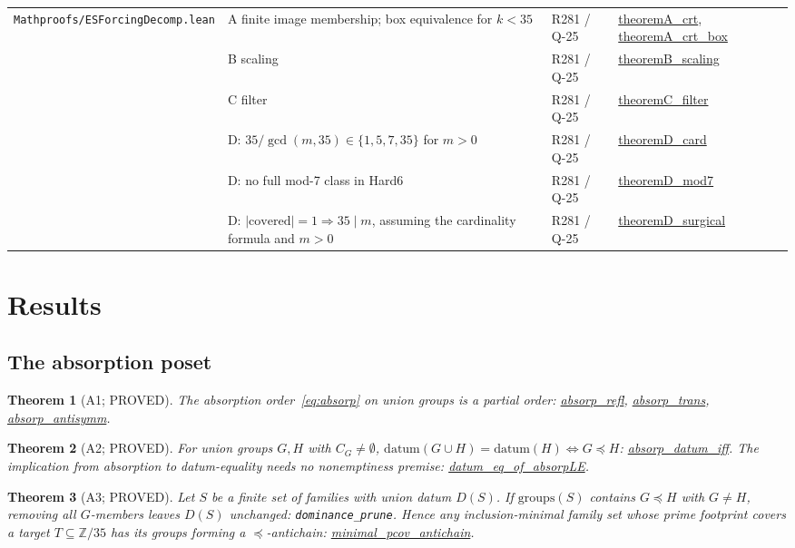 \documentclass[11pt,a4paper]{article}
\newtheorem{theorem}{Theorem}
\theoremstyle{definition}
\begin{document}
\begin{table}[t]
\begin{tabular}{p{3.6cm}p{4.6cm}p{2.6cm}p{3.6cm}}
    \texttt{\small Mathproofs/ESForcingDecomp.lean} &
      A finite image membership; box equivalence for $k<35$ & R281 / Q-25 &
      {\small\url{theoremA_crt}, \url{theoremA_crt_box}} \\
    & B scaling & R281 / Q-25 &
      {\small\url{theoremB_scaling}} \\
    & C filter & R281 / Q-25 &
      {\small\url{theoremC_filter}} \\
    & D: $35/\gcd(m,35)\in\{1,5,7,35\}$ for $m>0$ & R281 / Q-25 &
      {\small\url{theoremD_card}} \\
    & D: no full mod-7 class in Hard6 & R281 / Q-25 &
      {\small\url{theoremD_mod7}} \\
    & D: $|\mathrm{covered}|=1\Rightarrow35\mid m$, assuming the cardinality
      formula and $m>0$ & R281 / Q-25 &
      {\small\url{theoremD_surgical}} \\
    \bottomrule
  \end{tabular}
\end{table}

\section{Results}
\label{sec:results}

\subsection{The absorption poset}
\label{sec:absorp}

\begin{theorem}[A1; PROVED]
  \label{thm:a1}
  The absorption order~\eqref{eq:absorp} on union groups is a partial order:
  \url{absorp_refl}, \url{absorp_trans}, \url{absorp_antisymm}.
\end{theorem}

\begin{theorem}[A2; PROVED]
  \label{thm:a2}
  For union groups $G,H$ with $C_G\ne\emptyset$,
  $\text{datum}(G\cup H)=\text{datum}(H)\iff G\preceq H$:
  \url{absorp_datum_iff}. The implication from absorption to datum-equality
  needs no nonemptiness premise: \url{datum_eq_of_absorpLE}.
\end{theorem}

\begin{theorem}[A3; PROVED]
  \label{thm:a3}
  Let $S$ be a finite set of families with union datum $D(S)$.  If
  $\text{groups}(S)$ contains $G\preceq H$ with $G\ne H$, removing all
  $G$-members leaves $D(S)$ unchanged: \texttt{dominance\_prune}.  Hence any
  inclusion-minimal family set whose prime footprint covers a target
  $T\subseteq\mathbb{Z}/35$ has its groups forming a $\preceq$-antichain:
  \url{minimal_pcov_antichain}.
\end{theorem}
\end{document}
